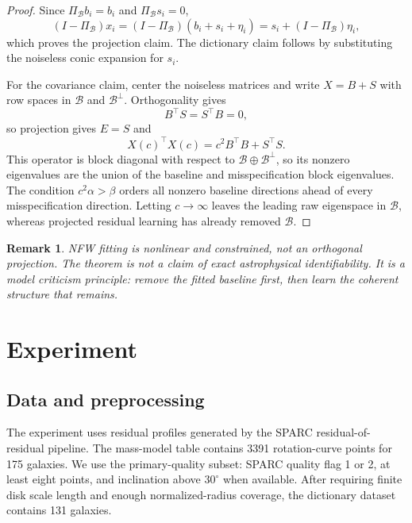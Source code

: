 \documentclass[10pt,twocolumn]{article}
\newcommand{\proj}{\Pi}
\newtheorem{remark}{Remark}
\begin{document}
\begin{proof}
Since $\proj_{\mathcal B}b_i=b_i$ and $\proj_{\mathcal B}s_i=0$,
\begin{equation}
(I-\proj_{\mathcal B})x_i
=(I-\proj_{\mathcal B})(b_i+s_i+\eta_i)
=s_i+(I-\proj_{\mathcal B})\eta_i,
\end{equation}
which proves the projection claim. The dictionary claim follows by substituting
the noiseless conic expansion for $s_i$.

For the covariance claim, center the noiseless matrices and write $X=B+S$ with
row spaces in $\mathcal B$ and $\mathcal B^\perp$. Orthogonality gives
\begin{equation}
B^\top S=S^\top B=0,
\end{equation}
so projection gives $E=S$ and
\begin{equation}
X(c)^\top X(c)=c^2B^\top B+S^\top S .
\end{equation}
This operator is block diagonal with respect to
$\mathcal B\oplus\mathcal B^\perp$, so its nonzero eigenvalues are the union of
the baseline and misspecification block eigenvalues. The condition
$c^2\alpha>\beta$ orders all nonzero baseline directions ahead of every
misspecification direction. Letting $c\to\infty$ leaves the leading raw
eigenspace in $\mathcal B$, whereas projected residual learning has already
removed $\mathcal B$.
\end{proof}

\begin{remark}
NFW fitting is nonlinear and constrained, not an orthogonal projection. The
theorem is not a claim of exact astrophysical identifiability. It is a model
criticism principle: remove the fitted baseline first, then learn the coherent
structure that remains.
\end{remark}

\section{Experiment}

\subsection{Data and preprocessing}

The experiment uses residual profiles generated by the SPARC
residual-of-residual pipeline. The mass-model table contains 3391
rotation-curve points for 175 galaxies. We use the primary-quality subset:
SPARC quality flag 1 or 2, at least eight points, and inclination above
$30^\circ$ when available. After requiring finite disk scale length and enough
normalized-radius coverage, the dictionary dataset contains 131 galaxies.
\end{document}
